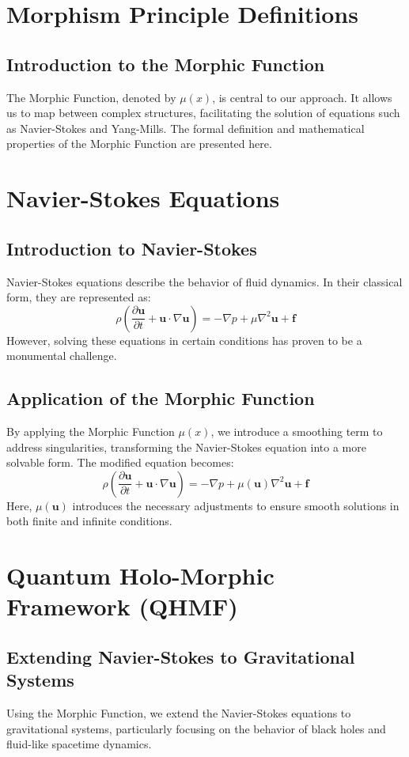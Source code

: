 \documentclass[12pt]{article}
\begin{document}
\section{Morphism Principle Definitions}
\subsection{Introduction to the Morphic Function}
The Morphic Function, denoted by $\mu(x)$, is central to our approach. It allows us to map between complex structures, facilitating the solution of equations such as Navier-Stokes and Yang-Mills. The formal definition and mathematical properties of the Morphic Function are presented here.

\section{Navier-Stokes Equations}
\subsection{Introduction to Navier-Stokes}
Navier-Stokes equations describe the behavior of fluid dynamics. In their classical form, they are represented as:
\[
\rho \left( \frac{\partial \mathbf{u}}{\partial t} + \mathbf{u} \cdot \nabla \mathbf{u} \right) = -\nabla p + \mu \nabla^2 \mathbf{u} + \mathbf{f}
\]
However, solving these equations in certain conditions has proven to be a monumental challenge.\\

\subsection{Application of the Morphic Function}
By applying the Morphic Function $\mu(x)$, we introduce a smoothing term to address singularities, transforming the Navier-Stokes equation into a more solvable form. The modified equation becomes:
\[
\rho \left( \frac{\partial \mathbf{u}}{\partial t} + \mathbf{u} \cdot \nabla \mathbf{u} \right) = -\nabla p + \mu(\mathbf{u}) \nabla^2 \mathbf{u} + \mathbf{f}
\]
Here, $\mu(\mathbf{u})$ introduces the necessary adjustments to ensure smooth solutions in both finite and infinite conditions.

\section{Quantum Holo-Morphic Framework (QHMF)}
\subsection{Extending Navier-Stokes to Gravitational Systems}
Using the Morphic Function, we extend the Navier-Stokes equations to gravitational systems, particularly focusing on the behavior of black holes and fluid-like spacetime dynamics.
\end{document}
